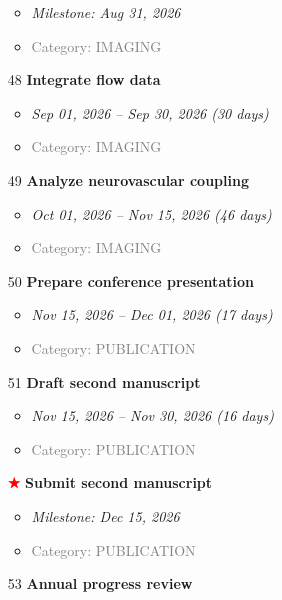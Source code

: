 \documentclass[portrait,a4paper]{article}
\begin{document}
\begin{enumerate}[leftmargin=0pt, itemindent=0pt, labelsep=0pt, labelwidth=0pt]
\begin{itemize}
        \item \textit{Milestone: Aug 31, 2026}
        \item \textcolor{gray}{Category: IMAGING}
    \end{itemize}
\vspace{0.3cm}
\item[48] \textbf{Integrate flow data}
    \begin{itemize}
        \item \textit{Sep 01, 2026 -- Sep 30, 2026 (30 days)}
        \item \textcolor{gray}{Category: IMAGING}
    \end{itemize}
\vspace{0.3cm}
\item[49] \textbf{Analyze neurovascular coupling}
    \begin{itemize}
        \item \textit{Oct 01, 2026 -- Nov 15, 2026 (46 days)}
        \item \textcolor{gray}{Category: IMAGING}
    \end{itemize}
\vspace{0.3cm}
\item[50] \textbf{Prepare conference presentation}
    \begin{itemize}
        \item \textit{Nov 15, 2026 -- Dec 01, 2026 (17 days)}
        \item \textcolor{gray}{Category: PUBLICATION}
    \end{itemize}
\vspace{0.3cm}
\item[51] \textbf{Draft second manuscript}
    \begin{itemize}
        \item \textit{Nov 15, 2026 -- Nov 30, 2026 (16 days)}
        \item \textcolor{gray}{Category: PUBLICATION}
    \end{itemize}
\vspace{0.3cm}
\item[\textcolor{red}{\textbf{★}}] \textbf{Submit second manuscript}
    \begin{itemize}
        \item \textit{Milestone: Dec 15, 2026}
        \item \textcolor{gray}{Category: PUBLICATION}
    \end{itemize}
\vspace{0.3cm}
\item[53] \textbf{Annual progress review}

\end{enumerate}
\end{document}
